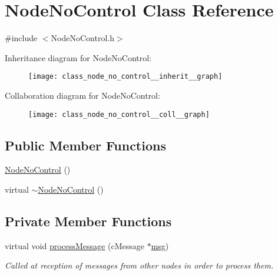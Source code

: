 \hypertarget{class_node_no_control}{}\section{Node\+No\+Control Class Reference}
\label{class_node_no_control}


{\ttfamily \#include $<$Node\+No\+Control.\+h$>$}



Inheritance diagram for Node\+No\+Control\+:
\nopagebreak
\begin{figure}[H]
\begin{center}
\leavevmode
\texttt{[image: class\_node\_no\_control\_\_inherit\_\_graph]}
\end{center}
\end{figure}


Collaboration diagram for Node\+No\+Control\+:
\nopagebreak
\begin{figure}[H]
\begin{center}
\leavevmode
\texttt{[image: class\_node\_no\_control\_\_coll\_\_graph]}
\end{center}
\end{figure}
\subsection*{Public Member Functions}
\begin{DoxyCompactItemize}
\item 
\hyperlink{class_node_no_control_ae48bd313edf922a104d690959f232822}{Node\+No\+Control} ()
\item 
virtual \hyperlink{class_node_no_control_a186d700d000404aa55658dd732e6ef4b}{$\sim$\+Node\+No\+Control} ()
\end{DoxyCompactItemize}
\subsection*{Private Member Functions}
\begin{DoxyCompactItemize}
\item 
virtual void \hyperlink{class_node_no_control_aa83bc408fe3dab03f124ea5489946836}{process\+Message} (c\+Message $\ast$\hyperlink{_controller_8h_afa0f3b802fbc219228f7bb97996fa558}{msg})
\begin{DoxyCompactList}\small\item\em Called at reception of messages from other nodes in order to process them. \end{DoxyCompactList}\end{DoxyCompactItemize}
